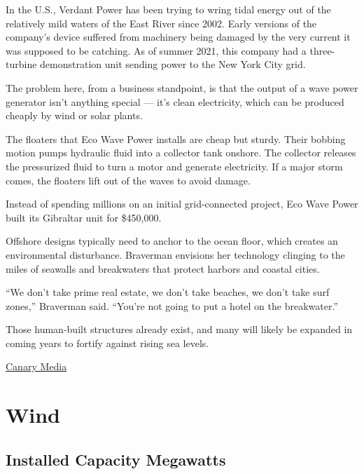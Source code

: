 \documentclass[
]{book}
\begin{document}
In the U.S., Verdant Power has been trying to wring tidal energy out of the relatively mild waters of the East River since 2002. Early versions of the company's device suffered from machinery being damaged by the very current it was supposed to be catching. As of summer 2021, this company had a three-turbine demonstration unit sending power to the New York City grid.

The problem here, from a business standpoint, is that the output of a wave power generator isn't anything special --- it's clean electricity, which can be produced cheaply by wind or solar plants.

The floaters that Eco Wave Power installs are cheap but sturdy. Their bobbing motion pumps hydraulic fluid into a collector tank onshore. The collector releases the pressurized fluid to turn a motor and generate electricity. If a major storm comes, the floaters lift out of the waves to avoid damage.

Instead of spending millions on an initial grid-connected project, Eco Wave Power built its Gibraltar unit for \$450,000.

Offshore designs typically need to anchor to the ocean floor, which creates an environmental disturbance. Braverman envisions her technology clinging to the miles of seawalls and breakwaters that protect harbors and coastal cities.

``We don't take prime real estate, we don't take beaches, we don't take surf zones,'' Braverman said. \hspace{0pt}``You're not going to put a hotel on the breakwater.''

Those human-built structures already exist, and many will likely be expanded in coming years to fortify against rising sea levels.

\href{https://www.canarymedia.com/articles/ocean-energy/is-shore-based-wave-power-the-key-to-unlocking-affordable-clean-energy-from-the-sea}{Canary Media}

\hypertarget{wind}{%
\chapter{Wind}\label{wind}}

\hypertarget{installed-capacity-megawatts}{%
\section{Installed Capacity Megawatts}\label{installed-capacity-megawatts}}
\end{document}
